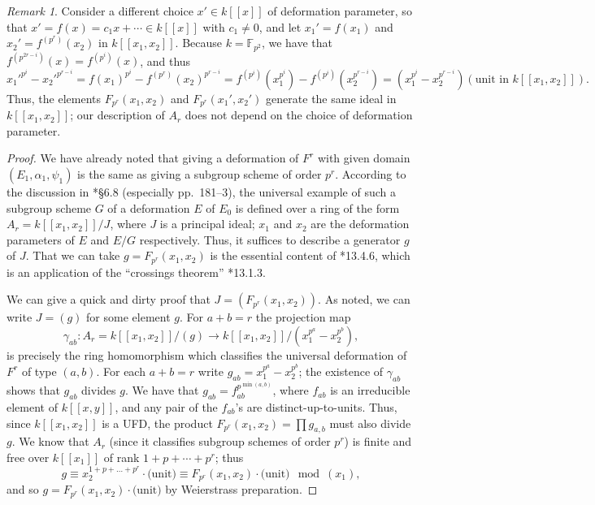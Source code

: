 \documentclass[11pt]{amsart}
\numberwithin{equation}{section}
\theoremstyle{plain}
\theoremstyle{remark}
\newtheorem{rem}[subsection]{Remark}
\theoremstyle{plain}
\begin{document}
\begin{rem}
Consider a different choice $x'\in k{[\![{x}]\!]}$ of deformation parameter, so
that $x'=f(x)=c_1x+\cdots \in k{[\![{x}]\!]}$ with $c_1\neq0$, and let
$x_1'=f(x_1)$ and $x_2'=f^{(p^r)}(x_2)$ in $k{[\![{x_1,x_2}]\!]}$.
Because $k={\mathbb{F}}_{p^2}$, we have that $f^{(p^{2r-i})}(x)=f^{(p^i)}(x)$,
and thus 
\[
x_1'^{p^i}-x_2'^{p^{r-i}}= f(x_1)^{p^i} -
f^{(p^r)}(x_2)^{p^{r-i}} = f^{(p^i)}(x_1^{p^i}) -
f^{(p^i)}(x_2^{p^{r-i}}) = (x_1^{p^i}-x_2^{p^{r-i}})(\text{unit in
  $k{[\![{x_1,x_2}]\!]}$}). 
\]
Thus, the elements $F_{p^r}(x_1,x_2)$ and
$F_{p^r}(x_1',x_2')$ generate the same ideal in 
$k{[\![{x_1,x_2}]\!]}$; our description of $A_r$ does not depend on the
choice of deformation parameter.
\end{rem}

\begin{proof}
We have already noted that giving a deformation of $F^r$ with given
domain $(E_1,\alpha_1,\psi_1)$ is the same as giving a subgroup scheme
of order $p^r$.  
According to the discussion in \cite{katz-mazur}*{\S6.8 (especially
pp.\ 181--3)}, the universal example of such a subgroup scheme $G$ of a
deformation $E$ of $E_0$ is defined over  a ring of the form
$A_r=k{[\![{x_1,x_2}]\!]}/J$, where $J$ is a principal ideal; $x_1$ and
$x_2$ are the deformation 
parameters of $E$ and $E/G$ respectively.  Thus, it suffices to
describe a generator $g$ of $J$.  That we can take
$g=F_{p^r}(x_1,x_2)$ is the 
essential content of \cite{katz-mazur}*{13.4.6}, which is an
application of the ``crossings theorem'' \cite{katz-mazur}*{13.1.3}.

We can give a quick and dirty proof that  $J=(F_{p^r}(x_1,x_2))$.
As noted, we can write $J=(g)$ for some element $g$.
For $a+b=r$ the projection map
\[
\gamma_{ab}\colon A_r=k{[\![{x_1,x_2}]\!]}/(g) {\rightarrow} 
k{[\![{x_1,x_2}]\!]}/(x_1^{p^a}-x_2^{p^b}),
\]
is precisely the ring homomorphism which classifies the universal
deformation of $F^r$ of type $(a,b)$.  For each $a+b=r$ write 
$g_{ab}=x_1^{p^a}-x_2^{p^b}$; the existence of $\gamma_{ab}$ shows that
$g_{ab}$ divides $g$.  We have that $g_{ab} =
f_{ab}^{p^{\min(a,b)}}$, where 
$f_{ab}$ is an irreducible element of $k{[\![{x,y}]\!]}$, and any pair of
the $f_{ab}$'s are distinct-up-to-units. 
Thus, since $k{[\![{x_1,x_2}]\!]}$ is a UFD,
the product $F_{p^r}(x_1,x_2)=\prod g_{a,b}$ must also divide
$g$.  
We know that $A_r$
(since it classifies subgroup schemes of order $p^r$) is finite and
free over $k{[\![{x_1}]\!]}$ of rank $1+p+\cdots+p^r$; thus 
\[
g\equiv x_2^{1+p+\dots+p^r}\cdot\text{(unit)} \equiv
F_{p^r}(x_1,x_2)\cdot 
\text{(unit)} \mod (x_1),
\]
and so $g=F_{p^r}(x_1,x_2)\cdot \text{(unit)}$ by Weierstrass preparation.
\end{proof}
\end{document}
